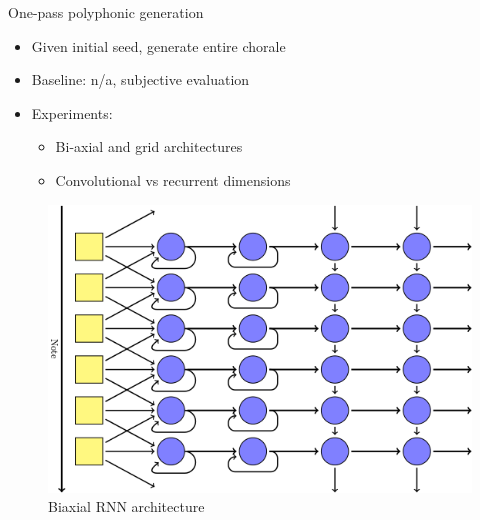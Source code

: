 \documentclass[final]{beamer}
\newlength{\onecolwid}
\newlength{\twocolwid}
\begin{document}
\begin{frame}[t]
\begin{columns}[t]
\begin{column}{\twocolwid}




\begin{columns}[t,totalwidth=\twocolwid] %

\begin{column}{\onecolwid} %


\begin{block}{One-pass polyphonic generation}
  \begin{itemize}
    \item Given initial seed, generate entire chorale
    \item Baseline: n/a, subjective evaluation
    \item Experiments:
      \begin{itemize}
        \item Bi-axial and grid architectures
        \item Convolutional vs recurrent dimensions
      \end{itemize}
  \end{itemize}
\end{block}

\begin{figure}
  \includegraphics[width=0.95\linewidth]{Figures/biaxial.png}
  \caption{Biaxial RNN architecture\cite{colah:lstm}}
\end{figure}


\end{column}
\end{columns}
\end{column}
\end{columns}
\end{frame}
\end{document}
